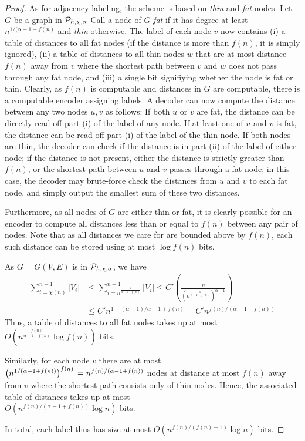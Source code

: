 \begin{proof}
As for adjacency labeling, the scheme is based on \emph{thin} and \emph{fat} nodes. Let $G$ be a graph
in $ \mathcal{P}_{h,\chi,\alpha}$ Call
a node of $G$ \emph{fat} if it has degree at least $n^{1/(\alpha - 1 + f(n)}$ and \emph{thin} otherwise.
The label of each node $v$ now contains (i) a table of distances to all fat nodes (if the distance is more than $f(n)$, it is simply ignored), (ii) a table of distances to all thin nodes $w$ that are at most distance $f(n)$ away from $v$
where the shortest path between $v$ and $w$ does not pass through any fat node, and (iii) a single bit signifiying whether the node is fat or thin.
Clearly, as $f(n)$ is computable and distances in $G$ are computable, there is a computable encoder
assigning labels. A decoder can now compute the distance between any two nodes $u,v$ as follows:
If both $u$ or $v$ are fat, the distance can be directly read off part (i) of the label of any node. If at least one of $u$ 
and $v$ is fat, the distance can be read off part (i) of the label of the thin node. If both nodes are thin, the decoder
can check if the distance is in part (ii) of the label of either node; if the distance is not present, 
either the distance is strictly greater than $f(n)$, or the shortest path between $u$ and $v$ passes through
a fat node; in this case, the decoder may brute-force check the distances from $u$ and $v$ to each fat node,
and simply output the smallest sum of these two distances.

Furthermore, as all nodes of $G$ are either thin or fat, it is clearly possible for an encoder to compute
all distances less than or equal to $f(n)$ between any pair of nodes. Note that as all distances we care for 
are bounded above by $f(n)$, each such distance can be stored using at most $\log f(n)$ bits.

As $G = G(V,E)$ is in $ \mathcal{P}_{h,\chi,\alpha}$, we have 
\begin{align*}
\sum_{i = \chi(n)}^{n-1} \vert V_i \vert
&\leq \sum_{i = n^{\frac{1}{\alpha - 1 + f(n)}}}^{n-1} \vert V_i \vert \leq C' \left( \frac{n}{\left( n^{\frac{1}{\alpha - 1 + f(n)}}\right)^{\alpha - 1}}\right)\\
&\leq C' n^{1 - (\alpha - 1)/{\alpha-1 + f(n)}} 
= C' n^{f(n)/(\alpha - 1 + f(n))}
\end{align*}
 Thus, a table of distances to all fat nodes takes up at most $O\left(n^{\frac{f(n)}{\alpha - 1 + f(n)}} \log f(n)\right)$ bits.

Similarly, for each node $v$ there are at most $\left(n^{1/(\alpha - 1 + f(n))}\right)^{f(n)} \\= n^{f(n)/(\alpha - 1 + f(n))}$ nodes at distance at most $f(n)$ away from $v$ where the shortest path consists only of thin nodes. Hence, the associated table of distances
takes up at most \\$O(n^{f(n)/(\alpha -1 + f(n))} \log n)$ bits.

In total, each label thus has size at most $O(n^{f(n)/(f(n)+1)} \log n)$ bits.
\end{proof}


